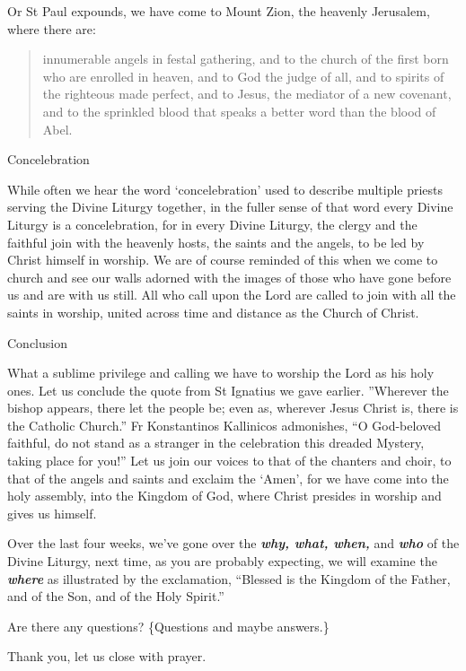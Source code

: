 \documentclass[
]{article}
\newcommand{\RL}[1]{\beginR #1\endR}
\begin{document}
Or St Paul expounds, we have come to Mount Zion, the heavenly Jerusalem,
where there are:

\begin{quote}
innumerable angels in festal gathering, and to the church of the first
born who are enrolled in heaven, and to God the judge of all, and to
spirits of the righteous made perfect, and to Jesus, the mediator of a
new covenant, and to the sprinkled blood that speaks a better word than
the blood of Abel.
\end{quote}

Concelebration

While often we hear the word `concelebration' used to describe multiple
priests serving the Divine Liturgy together, in the fuller sense of that
word every Divine Liturgy is a concelebration, for in every Divine
Liturgy, the clergy and the faithful join with the heavenly hosts, the
saints and the angels, to be led by Christ himself in worship. We are of
course reminded of this when we come to church and see our walls adorned
with the images of those who have gone before us and are with us still.
All who call upon the Lord are called to join with all the saints in
worship, united across time and distance as the Church of Christ.

Conclusion

What a sublime privilege and calling we have to worship the Lord as his
holy ones. Let us conclude the quote from St Ignatius we gave earlier.
\RL{''}Wherever the bishop appears, there let the people be; even as,
wherever Jesus Christ is, there is the Catholic Church.'' Fr
Konstantinos Kallinicos admonishes, ``O God-beloved faithful, do not
stand as a stranger in the celebration this dreaded Mystery, taking
place for you!'' Let us join our voices to that of the chanters and
choir, to that of the angels and saints and exclaim the `Amen', for we
have come into the holy assembly, into the Kingdom of God, where Christ
presides in worship and gives us himself.

Over the last four weeks, we've gone over the \textbf{\emph{why, what,
when,}} and \textbf{\emph{who}} of the Divine Liturgy, next time, as you
are probably expecting, we will examine the \textbf{\emph{where}} as
illustrated by the exclamation, ``Blessed is the Kingdom of the Father,
and of the Son, and of the Holy Spirit.''

Are there any questions? \{Questions and maybe answers.\}

Thank you, let us close with prayer.
\end{document}
